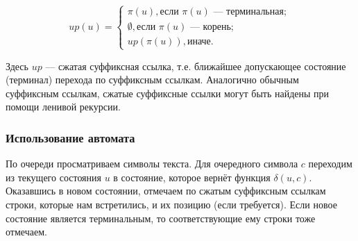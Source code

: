 $$up(u) = \begin{cases}
    \pi(u), \text{если $\pi(u)$ --- терминальная};\\
    \emptyset, \text{если $\pi(u)$ --- корень};\\
    up(\pi(u)), \text{иначе}.
\end{cases}$$

Здесь $up$ --- сжатая суффиксная ссылка, т.е. ближайшее допускающее состояние (терминал) перехода по суффиксным ссылкам.
Аналогично обычным суффиксным ссылкам, сжатые суффиксные ссылки могут быть найдены при помощи ленивой рекурсии.

\subsubsection{Использование автомата}

По очереди просматриваем символы текста.
Для очередного символа $c$ переходим из текущего состояния $u$ в состояние, которое вернёт функция $\delta(u,c)$.
Оказавшись в новом состоянии, отмечаем по сжатым суффиксным ссылкам строки, которые нам встретились, и их позицию (если требуется).
Если новое состояние является терминальным, то соответствующие ему строки тоже отмечаем.
